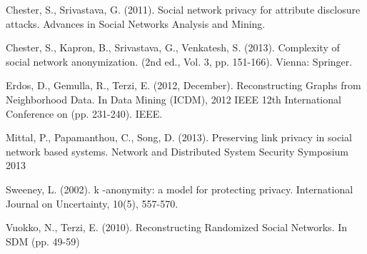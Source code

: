 

\begin{thebibliography}{19}

{\footnotesize 


  Chester, S.,  Srivastava, G. (2011). Social network privacy for attribute disclosure attacks. Advances in Social Networks Analysis and Mining.

 Chester, S., Kapron, B., Srivastava, G., Venkatesh, S. (2013). Complexity of social network anonymization. (2nd ed., Vol. 3, pp. 151-166). Vienna: Springer.

 Erdos, D., Gemulla, R., Terzi, E. (2012, December). Reconstructing Graphs from Neighborhood Data. In Data Mining (ICDM), 2012 IEEE 12th International Conference on (pp. 231-240). IEEE.

 Mittal, P., Papamanthou, C.,  Song, D. (2013). Preserving link privacy in social network based systems. Network and Distributed System Security Symposium 2013

 Sweeney, L. (2002). k -anonymity: a model for protecting privacy. International Journal on Uncertainty, 10(5), 557-570. 

 Vuokko, N., Terzi, E. (2010). Reconstructing Randomized Social Networks. In SDM (pp. 49-59)

}

\end{thebibliography}